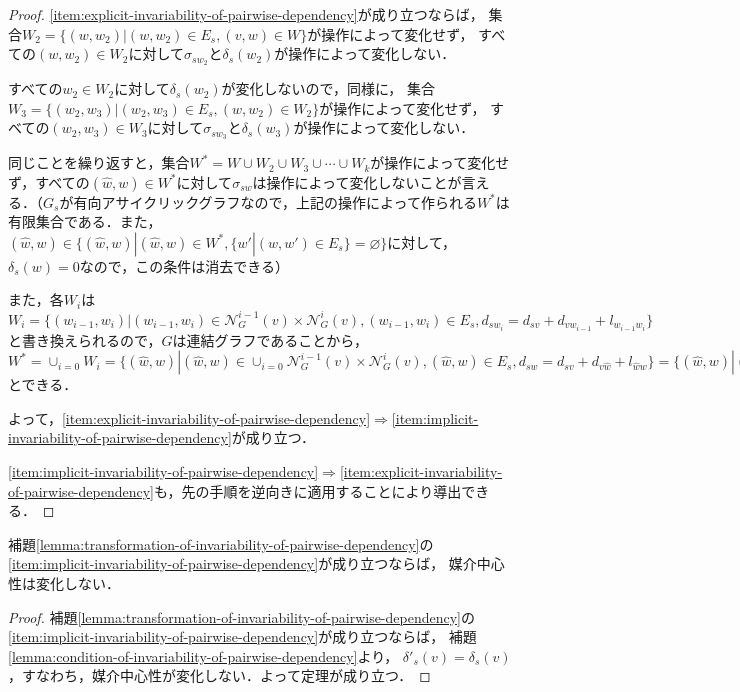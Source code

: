 \begin{proof}
  \ref{item:explicit-invariability-of-pairwise-dependency}が成り立つならば，
  集合$W_2=\{(w,w_2)|(w,w_2)\in E_s,(v,w)\in W\}$が操作によって変化せず，
  すべての$(w,w_2)\in W_2$に対して$\sigma_{sw_2}$と$\delta_s(w_2)$が操作によって変化しない．

  すべての$w_2\in W_2$に対して$\delta_s(w_2)$が変化しないので，同様に，
  集合$W_3=\{(w_2,w_3)|(w_2,w_3)\in E_s,(w,w_2)\in W_2\}$が操作によって変化せず，
  すべての$(w_2,w_3)\in W_3$に対して$\sigma_{sw_3}$と$\delta_s(w_3)$が操作によって変化しない．

  同じことを繰り返すと，集合$W^*=W\cup W_2\cup W_3\cup\cdots\cup W_k$が操作によって変化せず，すべての$(\hat{w},w)\in W^*$に対して$\sigma_{sw}$は操作によって変化しないことが言える．（$G_s$が有向アサイクリックグラフなので，上記の操作によって作られる$W^*$は有限集合である．また，$(\hat{w},w)\in\{(\hat{w},w)|(\hat{w},w)\in W^*,\{w'|(w,w')\in E_s\}=\varnothing\}$に対して，$\delta_s(w)=0$なので，この条件は消去できる）
  
  また，各$W_i$は$W_i=\{(w_{i-1},w_i)|(w_{i-1},w_i)\in\mathcal{N}^{i-1}_G(v)\times\mathcal{N}^i_G(v),(w_{i-1},w_i)\in E_s,d_{sw_i}=d_{sv}+d_{vw_{i-1}}+l_{w_{i-1}w_i}\}$と書き換えられるので，$G$は連結グラフであることから，$W^*=\cup_{i=0}W_i=\{(\hat{w},w)|(\hat{w},w)\in\cup_{i=0}\mathcal{N}^{i-1}_G(v)\times\mathcal{N}^i_G(v),(\hat{w},w)\in E_s,d_{sw}=d_{sv}+d_{v\hat{w}}+l_{\hat{w}w}\}=\{(\hat{w},w)|(\hat{w},w)\in E_s,d_{sw}=d_{sv}+d_{v\hat{w}}+l_{\hat{w}w}\}$とできる．

  よって，\ref{item:explicit-invariability-of-pairwise-dependency}$\Rightarrow$\ref{item:implicit-invariability-of-pairwise-dependency}が成り立つ．

  \ref{item:implicit-invariability-of-pairwise-dependency}$\Rightarrow$\ref{item:explicit-invariability-of-pairwise-dependency}も，先の手順を逆向きに適用することにより導出できる．
\end{proof}

\begin{theorem}
  補題\ref{lemma:transformation-of-invariability-of-pairwise-dependency}の
  \ref{item:implicit-invariability-of-pairwise-dependency}が成り立つならば，
  媒介中心性は変化しない．
\end{theorem}
\begin{proof}
  補題\ref{lemma:transformation-of-invariability-of-pairwise-dependency}の
  \ref{item:implicit-invariability-of-pairwise-dependency}が成り立つならば，
  補題\ref{lemma:condition-of-invariability-of-pairwise-dependency}より，
  $\delta'_s(v)=\delta_s(v)$，すなわち，媒介中心性が変化しない．よって定理が成り立つ．
\end{proof}

